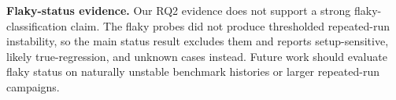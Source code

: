 \noindent\textbf{Flaky-status evidence.} Our RQ2 evidence does not support a strong flaky-classification claim. The flaky probes did not produce thresholded repeated-run instability, so the main status result excludes them and reports setup-sensitive, likely true-regression, and unknown cases instead. Future work should evaluate flaky status on naturally unstable benchmark histories or larger repeated-run campaigns.
